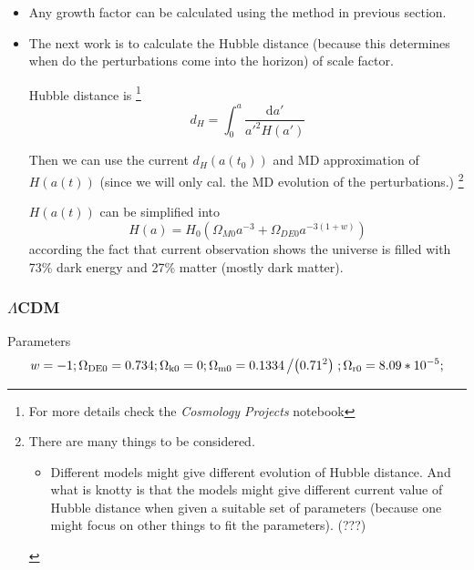 \documentclass{article}
\begin{document}
\begin{itemize}
\item
Any growth factor can be calculated using the method in previous section.

\item
The next work is to calculate the Hubble distance (because this determines when do the perturbations come into the horizon) of scale factor.

Hubble distance is 
\footnote{
For more details check the {\it Cosmology Projects} notebook}
\begin{equation}
d_H=\int^{a}_{0}{ \frac{\mathrm d a'}{a'^2H(a')} }
\end{equation}

Then we can use the current $d_H(a(t_0))$ and MD approximation of $H(a(t))$ (since we will only cal. the MD evolution of the perturbations.) 
\footnote{
There are many things to be considered. 
\begin{itemize}
\item 
Different models might give different evolution of Hubble distance. And what is knotty is that the models might give different current value of Hubble distance when given a suitable set of parameters (because one might focus on other things to fit the parameters). (???) 

\end{itemize}}

$H(a(t))$ can be simplified into 
\begin{equation}
H(a)=H_0 (\Omega_{M0}a^{-3}+\Omega_{DE0}a^{-3(1+w)})
\end{equation}
according the fact that current observation shows the universe is filled with 73\% dark energy and 27\% matter (mostly dark matter).

\end{itemize}


\subsubsection{$\Lambda$CDM}

Parameters
\begin{eqnarray*}
w=-1;\Omega _{\text{DE0}}=0.734;\Omega _{\text{k0}}=0;\Omega _{\text{m0}}=0.1334\left/\left(0.71^2\right)\right.;\Omega _{\text{r0}}=8.09*10^{-5};
\end{eqnarray*}
\end{document}
